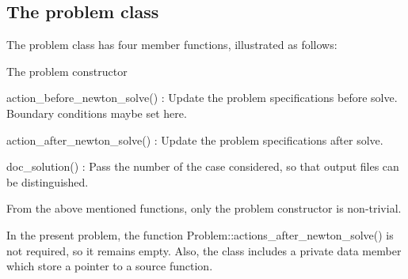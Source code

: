 \hypertarget{index_problem}{}\subsection{The problem class}\label{index_problem}
The problem class has four member functions, illustrated as follows\+:


\begin{DoxyItemize}
\item The problem constructor
\item {\ttfamily action\+\_\+before\+\_\+newton\+\_\+solve()} \+: Update the problem specifications before solve. Boundary conditions maybe set here.
\item {\ttfamily action\+\_\+after\+\_\+newton\+\_\+solve()} \+: Update the problem specifications after solve.
\item {\ttfamily doc\+\_\+solution()} \+: Pass the number of the case considered, so that output files can be distinguished.
\end{DoxyItemize}From the above mentioned functions, only the problem constructor is non-\/trivial.

In the present problem, the function {\ttfamily Problem\+::actions\+\_\+after\+\_\+newton\+\_\+solve()} is not required, so it remains empty. Also, the class includes a private data member which store a pointer to a source function.

